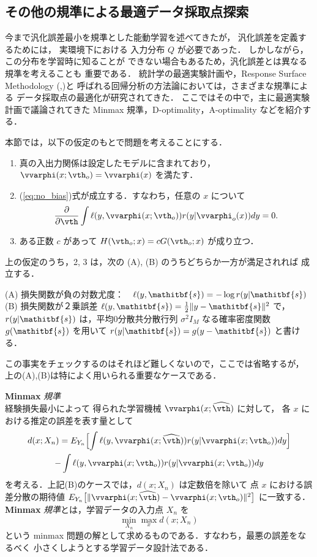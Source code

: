 \documentclass[master]{cimt}
\newcommand{\parder}[2]{\frac{\partial #1}{\partial #2}}
\newcommand{\hvth}{\widehat{{\vth}}}
\newcommand{\vs}{\mathitbf{s}}
\begin{document}
\subsection{その他の規準による最適データ採取点探索}
\label{sec:other_crit}
今まで汎化誤差最小を規準とした能動学習を述べてきたが，
汎化誤差を定義するためには，
実環境下における
入力分布 $Q$ が必要であった．
しかしながら，この分布を学習時に知ることが
できない場合もあるため，汎化誤差とは異なる規準を考えることも
重要である．
統計学の最適実験計画や，Response Surface Methodology 
(\cite{res_surf},\cite{res_surf2})と
呼ばれる回帰分析の方法論においては，さまざまな規準による
データ採取点の最適化が研究されてきた．
ここではその中で，主に最適実験計画で議論されてきた 
Minmax 規準，D-optimality，A-optimality などを紹介する．

本節では，以下の仮定のもとで問題を考えることにする．
\begin{enumerate}
\item 真の入出力関係は設定したモデルに含まれており，
$\vvarphi(x; \vth_o) = \vvarphi(x)$ を満たす．
\item 
(\ref{eq:no_bias})式が成立する．すなわち，任意の $x$ について
\[
	\parder{}{\vth} \int\ell(y ,\vvarphi(x; \vth_o)) 
		r(y | \vvarphi_o(x)) dy = 0.
\]
\item 
ある正数 $c$ があって 
$H(\vth_o; x) = c G(\vth_o; x)$ が成り立つ．
\end{enumerate}
上の仮定のうち，2, 3 は，次の (A), (B) のうちどちらか一方が満足されれば
成立する．

\medskip
\noindent
(A) 損失関数が負の対数尤度：　$\ell (y, \vs) = - \log r(y | \vs)$ \\
(B) 損失関数が２乗誤差 $\ell(y, \vs) = \frac{1}{2} \| y - \vs \|^2$ で，
$r(y|\vs)$ は，平均0分散共分散行列 $\sigma^2 I_M$ なる確率密度関数 
$g(\vs)$ を用いて $r(y | \vs ) = g(y - \vs) $ と書ける． 

\medskip
\noindent
この事実をチェックするのはそれほど難しくないので，ここでは省略するが，
上の(A),(B)は特によく用いられる重要なケースである．


\bigskip
\noindent
{\bf Minmax }{\em 規準}\\
経験損失最小によって
得られた学習機械 $\vvarphi(x;\hvth)$ に対して，
各 $x$ における推定の誤差を表す量として
\begin{multline*}
	 d(x; X_n)	 = E_{Y_n}\Bigl[
	\int \ell(y, \vvarphi(x; \hvth) ) r(y | \vvarphi(x; \vth_o)) 
	dy \Bigr] \\ - \int \ell(y, \vvarphi(x; \vth_o) ) 
	r(y | \vvarphi(x; \vth_o)) dy
\end{multline*}
を考える．上記(B)のケースでは，$d(x; X_n)$ は定数倍を除いて 
点 $x$ における誤差分散の期待値 $ E_{Y_n}\bigl[ 
\| \vvarphi(x;  \hvth)- \vvarphi(x; \vth_o) \|^2 \bigr]$ に一致する．
{\bf Minmax }{\em 規準}とは，学習データの入力点 $X_n$ を
\begin{equation}
\label{eq:minmax}
	\min_{X_n} \max_{x}  d(x; X_n) 
\end{equation}
という minmax 問題の解として求めるものである．すなわち，最悪の誤差をなるべく
小さくしようとする学習データ設計法である．
\end{document}
